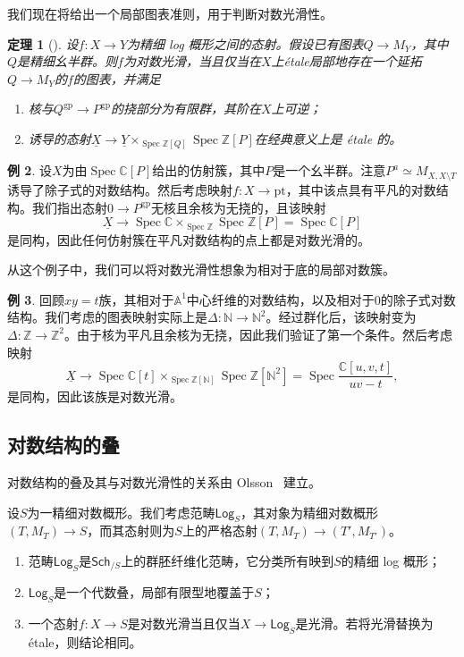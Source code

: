 \documentclass{amsart}
\newtheorem{thm}{定理}[section]
\theoremstyle{definition}
\newtheorem{exm}[thm]{例}
\theoremstyle{remark}
\theoremstyle{plain}
\theoremstyle{definition}
\theoremstyle{remark}
\newcommand{\A}{\mathbb{A}}
\newcommand{\N}{\mathbb{N}}
\newcommand{\C}{\mathbb{C}}
\newcommand{\Z}{\mathbb{Z}}
\newcommand{\mr}[1]{\mathrm{#1}}
\newcommand{\ms}[1]{\mathsf{#1}}
\newcommand{\ul}[1]{\underline{#1}}
\newcommand{\1}{\mathbf{1}}
\newcommand{\2}{\mathbf{2}}
\newcommand{\3}{\mathbf{3}}
\DeclareMathOperator{\Spec}{Spec}
\begin{document}
我们现在将给出一个局部图表准则，用于判断对数光滑性。

\begin{thm}[{\cite[定理~3.5]{Kato1989}}]
    设\(f \colon X \to Y\)为精细 log 概形之间的态射。假设已有图表\(Q \to M_Y\)，其中\(Q\)是精细幺半群。则\(f\)为对数光滑，当且仅当在\(X\)上\'etale局部地存在一个延拓\(Q \to M_Y\)的\(f\)的图表，并满足
    \begin{enumerate}
        \item 核与\(Q^{\mr{gp}} \to P^{\mr{gp}}\)的挠部分为有限群，其阶在\(X\)上可逆；
\item 诱导的态射\(\ul{X} \to \ul{Y} \times_{\Spec \Z[Q]} \Spec \Z[P]\)在经典意义上是 \'etale 的。
    \end{enumerate}
\end{thm}

\begin{exm}
    设\(X\)为由\(\Spec \C[P]\)给出的仿射簇，其中\(P\)是一个幺半群。注意\(P^a \simeq M_{X, X \setminus T}\)诱导了除子式的对数结构。然后考虑映射\(f \colon X \to \mr{pt}\)，其中该点具有平凡的对数结构。我们指出态射\(0 \to P^{\mr{gp}}\)无核且余核为无挠的，且该映射
    \[ \ul{X} \to \Spec \C \times_{\Spec \Z} \Spec \Z[P] = \Spec \C[P] \]
    是同构，因此任何仿射簇在平凡对数结构的点上都是对数光滑的。
\end{exm}

从这个例子中，我们可以将对数光滑性想象为相对于底的局部对数簇。

\begin{exm}
    回顾\(xy = t\)族，其相对于\(\A^1\)中心纤维的对数结构，以及相对于\(0\)的除子式对数结构。我们考虑的图表映射实际上是\(\Delta \colon \N \to \N^2\)。经过群化后，该映射变为\(\Delta \colon \Z \to \Z^2\)。由于核为平凡且余核为无挠，因此我们验证了第一个条件。然后考虑映射
    \[ \ul{X} \to \Spec \C[t] \times_{\Spec \Z[\N]} \Spec \Z[\N^2] = \Spec \frac{\C[u,v,t]}{uv-t}, \]
是同构，因此该族是对数光滑。
\end{exm}

\subsection{对数结构的叠}%
\label{sub:Stack of log structures}

对数结构的叠及其与对数光滑性的关系由 Olsson~\cite{Olsson2003} 建立。

设\(S\)为一精细对数概形。我们考虑范畴\(\ms{Log}_S\)，其对象为精细对数概形\((T, M_T) \to S\)，而其态射则为\(S\)上的严格态射\((T, M_T) \to (T', M_{T'})\)。
\begin{enumerate}
    \item 范畴\(\ms{Log}_S\)是\(\ms{Sch}_{/S}\)上的群胚纤维化范畴，它分类所有映到\(S\)的精细 log 概形；
\item \(\ms{Log}_S\)是一个代数叠，局部有限型地覆盖于\(S\)；
\item 一个态射\(f \colon X \to S\)是对数光滑当且仅当\(X \to \ms{Log}_S\)是光滑。若将光滑替换为 \'etale，则结论相同。
\end{enumerate}
\end{document}
